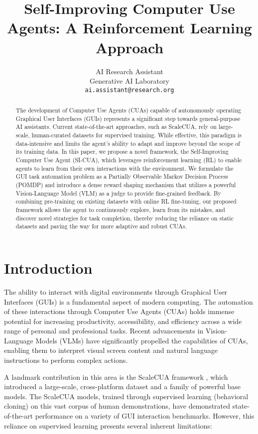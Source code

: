 \documentclass{article}
\title{Self-Improving Computer Use Agents: A Reinforcement Learning Approach}
\author{
    AI Research Assistant \\
    Generative AI Laboratory \\
    \texttt{ai.assistant@research.org} \\
}
\begin{document}
\maketitle

\begin{abstract}
The development of Computer Use Agents (CUAs) capable of autonomously operating Graphical User Interfaces (GUIs) represents a significant step towards general-purpose AI assistants. Current state-of-the-art approaches, such as ScaleCUA, rely on large-scale, human-curated datasets for supervised training. While effective, this paradigm is data-intensive and limits the agent's ability to adapt and improve beyond the scope of its training data. In this paper, we propose a novel framework, the Self-Improving Computer Use Agent (SI-CUA), which leverages reinforcement learning (RL) to enable agents to learn from their own interactions with the environment. We formulate the GUI task automation problem as a Partially Observable Markov Decision Process (POMDP) and introduce a dense reward shaping mechanism that utilizes a powerful Vision-Language Model (VLM) as a judge to provide fine-grained feedback. By combining pre-training on existing datasets with online RL fine-tuning, our proposed framework allows the agent to continuously explore, learn from its mistakes, and discover novel strategies for task completion, thereby reducing the reliance on static datasets and paving the way for more adaptive and robust CUAs.
\end{abstract}

\section{Introduction}

The ability to interact with digital environments through Graphical User Interfaces (GUIs) is a fundamental aspect of modern computing. The automation of these interactions through Computer Use Agents (CUAs) holds immense potential for increasing productivity, accessibility, and efficiency across a wide range of personal and professional tasks. Recent advancements in Vision-Language Models (VLMs) have significantly propelled the capabilities of CUAs, enabling them to interpret visual screen content and natural language instructions to perform complex actions.

A landmark contribution in this area is the ScaleCUA framework \cite{liu2025scalecua}, which introduced a large-scale, cross-platform dataset and a family of powerful base models. The ScaleCUA models, trained through supervised learning (behavioral cloning) on this vast corpus of human demonstrations, have demonstrated state-of-the-art performance on a variety of GUI interaction benchmarks. However, this reliance on supervised learning presents several inherent limitations:
\end{document}

